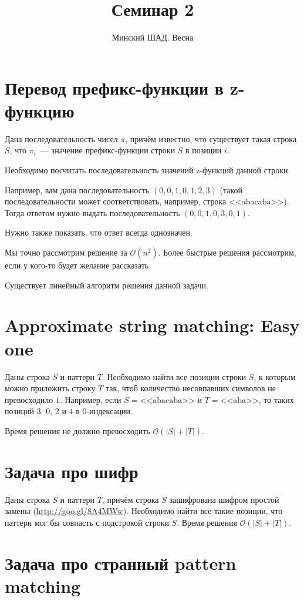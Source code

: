 \documentclass[addpoints]{exam}
\title{Семинар 2}
\author{Минский ШАД. Весна}
\begin{document}
\maketitle

\section{Перевод префикс-функции в z-функцию}

Дана последовательность чисел $\pi$, причём известно, что существует такая строка $S$, что $\pi_i$~--- значение префикс-функции строки $S$ в позиции $i$.

Необходимо посчитать последовательность значений z-функций данной строки.

Например, вам дана последовательность $(0, 0, 1, 0, 1, 2, 3)$  (такой последовательности может соответствовать, например, строка <<abacaba>>). Тогда ответом нужно выдать последовательность $(0, 0, 1, 0, 3, 0, 1)$.

Нужно также показать, что ответ всегда однозначен.

Мы точно рассмотрим решение за $\mathcal{O}(n^2)$. Более быстрые решения рассмотрим, если у кого-то будет желание рассказать.

Существует линейный алгоритм решения данной задачи.

\section{Approximate string matching: Easy one}

Даны строка $S$ и паттерн $T$. Необходимо найти все позиции строки $S$, к которым можно приложить строку $T$ так, чтоб количество несовпавших символов не превосходило $1$. Например, если $S=\mbox{<<abacaba>>}$ и $T=\mbox{<<aba>>}$, то таких позиций $3$: $0$, $2$ и $4$ в $0$-индексации.

Время решения не должно превосходить $\mathcal{O}(|S| + |T|)$.

\section{Задача про шифр}

Даны строка $S$ и паттерн $T$, причём строка $S$ зашифрована шифром простой замены (\url{http://goo.gl/8A4MWw}). Необходимо найти все такие позиции, что паттерн мог бы совпасть с подстрокой строки $S$. Время решения $\mathcal{O}(|S| + |T|)$.

\section{Задача про странный pattern matching}
\end{document}
